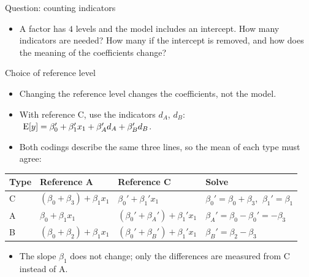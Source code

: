 \begin{frame}{Question: counting indicators}
    \begin{itemize}
        \item A factor has $4$ levels and the model includes an intercept. How many indicators are needed? How many if the intercept is removed, and how does the meaning of the coefficients change?
    \end{itemize}
\end{frame}


\begin{frame}{Choice of reference level}
    \begin{itemize}
        \item Changing the reference level changes the coefficients, not the model.
        \item With reference C, use the indicators $d_A$, $d_B$: $\ \operatorname{E}[y] = \beta_0' + \beta_1' x_1 + \beta_A' d_A + \beta_B' d_B$.
        \item Both codings describe the same three lines, so the mean of each type must agree:
    \end{itemize}
    \centering
    \small
    \begin{tabular}{llll}
        \toprule
        Type & Reference A & Reference C & Solve \\
        \midrule
        C & $(\beta_0 + \beta_3) + \beta_1 x_1$ & $\beta_0' + \beta_1' x_1$ & $\beta_0' = \beta_0 + \beta_3$, $\ \beta_1' = \beta_1$ \\
        A & $\beta_0 + \beta_1 x_1$ & $(\beta_0' + \beta_A') + \beta_1' x_1$ & $\beta_A' = \beta_0 - \beta_0' = -\beta_3$ \\
        B & $(\beta_0 + \beta_2) + \beta_1 x_1$ & $(\beta_0' + \beta_B') + \beta_1' x_1$ & $\beta_B' = \beta_2 - \beta_3$ \\
        \bottomrule
    \end{tabular}

    \vspace{0.8em}
    \raggedright
    \begin{itemize}
        \item The slope $\beta_1$ does not change; only the differences are measured from C instead of A.
    \end{itemize}
\end{frame}


